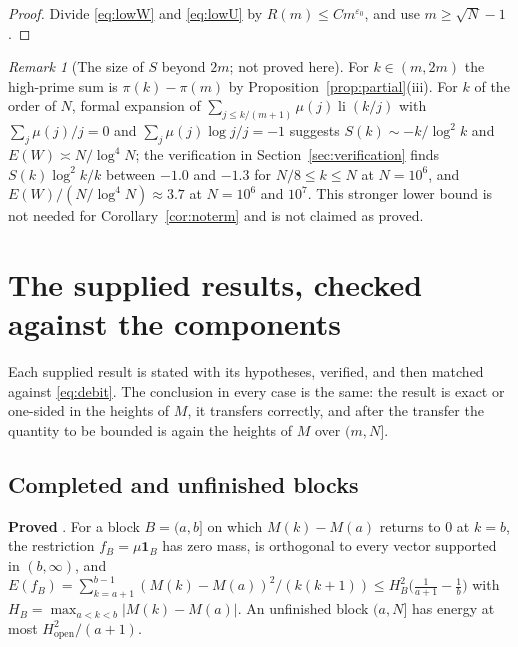 \documentclass[11pt]{article}
\theoremstyle{definition}
\theoremstyle{remark}
\newtheorem{remark}[theorem]{Remark}
\DeclareMathOperator{\li}{li}
\begin{document}
\begin{proof}
Divide \eqref{eq:lowW} and \eqref{eq:lowU} by $R(m)\le Cm^{\varepsilon_0}$, and use $m\ge\sqrt N-1$.
\end{proof}

\begin{remark}[The size of $S$ beyond $2m$; not proved here]\label{rem:middle}
For $k\in(m,2m)$ the high-prime sum is $\pi(k)-\pi(m)$ by Proposition~\ref{prop:partial}(iii). For $k$ of the order of $N$, formal expansion of $\sum_{j\le k/(m+1)}\mu(j)\li(k/j)$ with $\sum_j\mu(j)/j=0$ and $\sum_j\mu(j)\log j/j=-1$ suggests $S(k)\sim-k/\log^2k$ and $E(W)\asymp N/\log^4N$; the verification in Section~\ref{sec:verification} finds $S(k)\log^2k/k$ between $-1.0$ and $-1.3$ for $N/8\le k\le N$ at $N=10^6$, and $E(W)/(N/\log^4N)\approx3.7$ at $N=10^6$ and $10^7$. This stronger lower bound is not needed for Corollary~\ref{cor:noterm} and is not claimed as proved.
\end{remark}

\section{The supplied results, checked against the components}\label{sec:supplied}

Each supplied result is stated with its hypotheses, verified, and then matched against \eqref{eq:debit}. The conclusion in every case is the same: the result is exact or one-sided in the heights of $M$, it transfers correctly, and after the transfer the quantity to be bounded is again the heights of $M$ over $(m,N]$.

\subsection{Completed and unfinished blocks}

\textbf{Proved} \cite[Theorems on future orthogonality, block energy and the native block budget, \S\S5, 8, 11]{mm2}. For a block $B=(a,b]$ on which $M(k)-M(a)$ returns to $0$ at $k=b$, the restriction $f_B=\mu\mathbf 1_{B}$ has zero mass, is orthogonal to every vector supported in $(b,\infty)$, and $E(f_B)=\sum_{k=a+1}^{b-1}(M(k)-M(a))^2/(k(k+1))\le H_B^2\big(\frac1{a+1}-\frac1b\big)$ with $H_B=\max_{a<k<b}|M(k)-M(a)|$. An unfinished block $(a,N]$ has energy at most $H_{\mathrm{open}}^2/(a+1)$.
\end{document}

